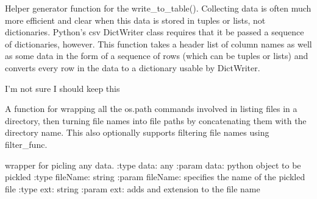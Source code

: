 \documentclass[letterpaper,10pt,english]{sphinxmanual}
\begin{document}

\begin{fulllineitems}
\label{test:gum.create_row_dicts}
Helper generator function for the write\_to\_table(). Collecting data
is often much more efficient and clear when this data is stored in tuples
or lists, not dictionaries.
Python's csv DictWriter class requires that it be passed a sequence of 
dictionaries, however.
This function takes a header list of column names as well as some data in
the form of a sequence of rows (which can be tuples or lists) and converts
every row in the data to a dictionary usable by DictWriter.

\end{fulllineitems}


\begin{fulllineitems}
\label{test:gum.find_something}
I'm not sure I should keep this

\end{fulllineitems}


\begin{fulllineitems}
\label{test:gum.gen_file_paths}
A function for wrapping all the os.path commands involved in listing files
in a directory, then turning file names into file paths by concatenating
them with the directory name.
This also optionally supports filtering file names using filter\_func.

\end{fulllineitems}


\begin{fulllineitems}
\label{test:gum.pickle_data}
wrapper for picling any data.
:type data: any
:param data: python object to be pickled
:type fileName: string
:param fileName: specifies the name of the pickled file
:type ext: string
:param ext: adds and extension to the file name

\end{fulllineitems}
\end{document}
